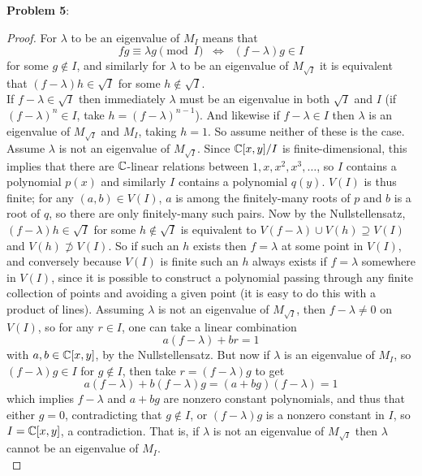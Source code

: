 \documentclass{amsart}
\begin{document}
	\textbf{Problem 5}:
	\begin{proof}
		For $\lambda$ to be an eigenvalue of $M_I$ means that $$fg \equiv \lambda g \pmod I \;\; \iff \;\; (f-\lambda)g \in I $$ for some $g\not\in I$, and similarly for $\lambda$ to be an eigenvalue of $M_{\sqrt{I}}$ it is equivalent that $(f-\lambda)h \in \sqrt{I}$ for some $h\not\in \sqrt{I}$.\\
		
%		
		If $f-\lambda \in \sqrt{I}$ then immediately $\lambda$ must be an eigenvalue in both $\sqrt{I}$ and $I$ (if $(f-\lambda)^n\in I$, take $h=(f-\lambda)^{n-1}$). And likewise if $f-\lambda \in I$ then $\lambda$ is an eigenvalue of $M_{\sqrt{I}}$ and $M_I$, taking $h=1$. So assume neither of these is the case.\\
		
		Assume $\lambda$ is not an eigenvalue of $M_{\sqrt{I}}$. Since $\mathbb{C}[x,y]/I$ is finite-dimensional, this implies that there are $\mathbb{C}$-linear relations between $1,x,x^2,x^3,\dots$, so $I$ contains a polynomial $p(x)$ and similarly $I$ contains a polynomial $q(y)$. $V(I)$ is thus finite; for any $(a,b)\in V(I)$, $a$ is among the finitely-many roots of $p$ and $b$ is a root of $q$, so there are only finitely-many such pairs. Now by the Nullstellensatz, $(f-\lambda)h\in \sqrt{I}$ for some $h\not\in \sqrt{I}$ is equivalent to $V(f-\lambda)\cup V(h)\supseteq V(I)$ and $V(h)\not\supset V(I)$. So if such an $h$ exists then $f=\lambda$ at some point in $V(I)$, and conversely because $V(I)$ is finite such an $h$ always exists if $f=\lambda$ somewhere in $V(I)$, since it is possible to construct a polynomial passing through any finite collection of points and avoiding a given point (it is easy to do this with a product of lines). Assuming $\lambda$ is not an eigenvalue of $M_{\sqrt{I}}$, then $f-\lambda \neq 0$ on $V(I)$, so for any $r\in I$, one can take a linear combination $$a(f-\lambda)+br=1$$
		with $a,b\in \mathbb{C}[x,y]$, by the Nullstellensatz. But now if $\lambda$ is an eigenvalue of $M_I$, so $(f-\lambda)g\in I$ for $g\not\in I$, then take $r=(f-\lambda)g$ to get
		$$
		a(f-\lambda) + b(f-\lambda)g = (a+bg)(f-\lambda) = 1
		$$
		which implies $f-\lambda$ and $a+bg$ are nonzero constant polynomials, and thus that either $g=0$, contradicting that $g\not\in I$, or $(f-\lambda)g$ is a nonzero constant in $I$, so $I=\mathbb{C}[x,y]$, a contradiction. That is, if $\lambda$ is not an eigenvalue of $M_{\sqrt{I}}$ then $\lambda$ cannot be an eigenvalue of $M_I$.
		\\


\end{proof}
\end{document}
